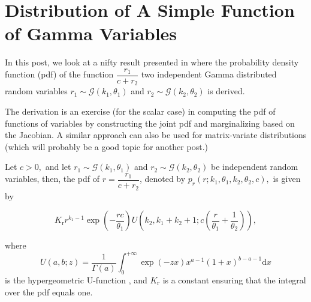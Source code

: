 \section{Distribution of A Simple Function of Gamma Variables}

In this post, we look at a nifty result presented in \cite{Krishnamoorthy2019} where the probability density function (pdf) of the function $\dfrac{r_1}{c+r_2}$ two independent Gamma distributed random variables $r_1 \sim \mathcal{G}(k_1,\theta_1)$ and $r_2 \sim \mathcal{G}(k_2, \theta_2)$ is derived.

The derivation is an exercise (for the scalar case) in computing the pdf of functions of variables by constructing the joint pdf and marginalizing based on the Jacobian. A similar approach can also be used for matrix-variate distributions (which will probably be a good topic for another post.)

\begin{theorem}
Let $c > 0,$ and let $r_1 \sim \mathcal{G}(k_1,\theta_1)$ and $r_2 \sim \mathcal{G}(k_2, \theta_2)$ be independent random variables, then, the pdf of $r = \dfrac{r_1}{c+r_2}$, denoted by $p_r(r;k_1,\theta_1,k_2,\theta_2,c),$ is given by

\begin{equation}K_\mathrm{r} r^{k_1-1} \exp\left(-\frac{rc}{\theta_1}\right) U\left(k_2,k_1+k_2+1;c\left(\frac{r}{\theta_1}+\frac{1}{\theta_2}\right)\right),\end{equation}

where $$U(a,b;z) = \frac{1}{\Gamma(a)} \int_{0}^{+\infty} \exp(-zx) x^{a-1} (1+x)^{b-a-1} \mathrm{d}x$$ is the hypergeometric U-function \cite[Chapter 13, Kummer function]{Olver2010}, and $K_\mathrm{r}$ is a constant ensuring that the integral over the pdf equals one.
\end{theorem}

